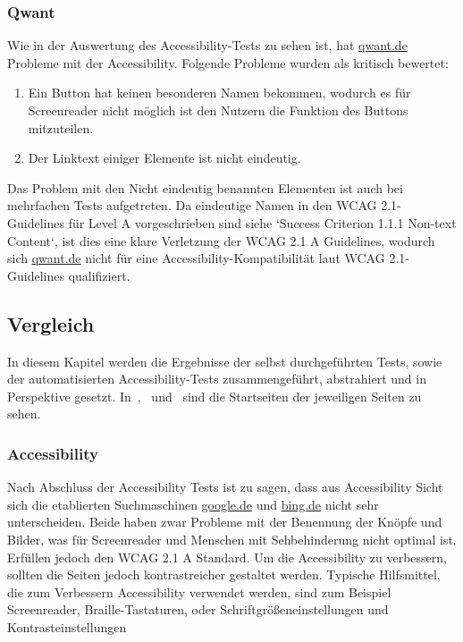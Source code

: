 \subsubsection{Qwant}\label{subsubsec:qwant}
Wie in der Auswertung des Accessibility-Tests zu sehen ist, hat \url{qwant.de} Probleme mit der Accessibility.
Folgende Probleme wurden als kritisch bewertet:
\begin{enumerate}
    \item Ein Button hat keinen besonderen Namen bekommen, wodurch es für Screenreader nicht möglich ist den Nutzern die Funktion des Buttons mitzuteilen.
    \item Der Linktext einiger Elemente ist nicht eindeutig.
\end{enumerate}
Das Problem mit den Nicht eindeutig benannten Elementen ist auch bei mehrfachen Tests aufgetreten.
Da eindeutige Namen in den \ac{WCAG} 2.1-Guidelines für Level A vorgeschrieben sind siehe `Success Criterion 1.1.1 Non-text Content`\autocite{WCAG21},
ist dies eine klare Verletzung der \ac{WCAG} 2.1 A Guidelines, wodurch sich \url{qwant.de} nicht für eine Accessibility-Kompatibilität laut \ac{WCAG} 2.1-Guidelines qualifiziert.

\subsection{Vergleich}\label{subsec:vergleich}
In diesem Kapitel werden die Ergebnisse der selbst durchgeführten Tests,
sowie der automatisierten Accessibility-Tests zusammengeführt, abstrahiert und in Perspektive gesetzt.
In~,~ und~ sind die Startseiten der jeweiligen Seiten zu sehen.\\

\subsubsection*{Accessibility}\label{subsubsec:accessibility}
Nach Abschluss der Accessibility Tests ist zu sagen,
dass aus Accessibility Sicht sich die etablierten Suchmaschinen \url{google.de} und \url{bing.de} nicht sehr unterscheiden.
Beide haben zwar Probleme mit der Benennung der Knöpfe und Bilder, was für Screenreader und Menschen mit Sehbehinderung nicht optimal ist.
Erfüllen jedoch den \ac{WCAG} 2.1 A Standard.
Um die Accessibility zu verbessern, sollten die Seiten jedoch kontrastreicher gestaltet werden.
Typische Hilfsmittel, die zum Verbessern Accessibility verwendet werden, sind zum Beispiel Screenreader, Braille-Tastaturen, oder Schriftgrößeneinstellungen und Kontrasteinstellungen~\autocite[vgl.][24]{9783960886297}
\\

